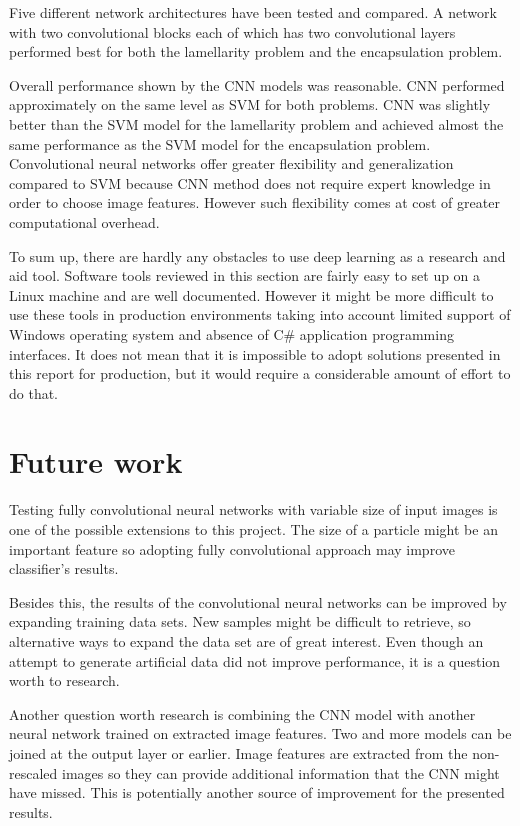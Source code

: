 \documentclass[a4paper, 11pt, table]{article}
\begin{document}
Five different network architectures have been tested and compared. A network with two convolutional blocks each of which has two convolutional layers performed best for both the lamellarity problem and the encapsulation problem. 

Overall performance shown by the CNN models was reasonable. CNN performed approximately on the same level as SVM for both problems. CNN was slightly better than the SVM model for the lamellarity problem and achieved almost the same performance as the SVM model for the encapsulation problem. Convolutional neural networks offer greater flexibility and generalization compared to SVM because CNN method does not require expert knowledge in order to choose image features. However such flexibility comes at cost of greater computational overhead.

To sum up, there are hardly any obstacles to use deep learning as a
research and aid tool. Software tools reviewed in this section are fairly easy
to set up on a Linux machine and are well documented. However it might
be more difficult to use these tools in production environments taking into
account limited support of Windows operating system and absence of C\#
application programming interfaces. It does not mean that it is impossible to
adopt  solutions presented in this report for production, but it would require a
considerable amount of effort to do that.

\section{Future work}
Testing fully convolutional neural networks with variable size of input images is one of the possible extensions to this project. The size of a particle might be an important feature so adopting fully convolutional approach may improve classifier's results.

Besides this, the results of the convolutional neural networks can be improved by expanding training data sets. New samples might be difficult to retrieve, so alternative ways to expand the data set are of great interest. Even though an attempt to generate artificial data did not improve performance, it is a question worth to research.

Another question worth research is combining the CNN model with another neural network trained on extracted image features. Two and more models can be joined at the output layer or earlier. Image features are extracted from the non-rescaled images so they can provide additional information that the CNN might have missed. This is potentially another source of improvement for the presented results.

\newpage
\printbibliography
\end{document}
